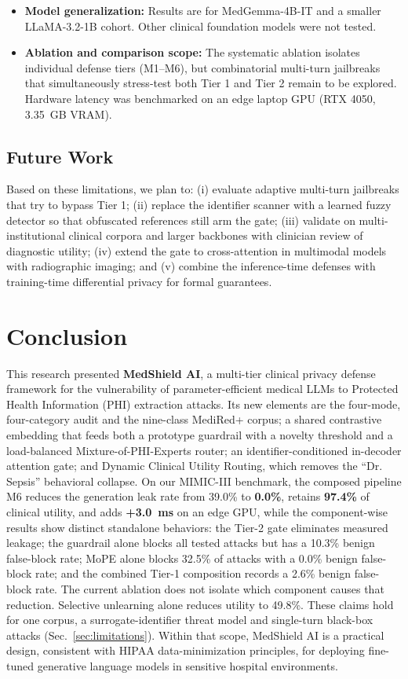 \documentclass[lettersize,journal]{IEEEtran}
\begin{document}
\begin{itemize}
    \item \textbf{Model generalization:} Results are for MedGemma-4B-IT and a smaller LLaMA-3.2-1B cohort. Other clinical foundation models were not tested.
    \item \textbf{Ablation and comparison scope:} The systematic ablation isolates individual defense tiers (M1--M6), but combinatorial multi-turn jailbreaks that simultaneously stress-test both Tier 1 and Tier 2 remain to be explored. Hardware latency was benchmarked on an edge laptop GPU (RTX 4050, 3.35~GB VRAM).
\end{itemize}

\subsection{Future Work}
Based on these limitations, we plan to: (i) evaluate adaptive multi-turn jailbreaks that try to bypass Tier 1; (ii) replace the identifier scanner with a learned fuzzy detector so that obfuscated references still arm the gate; (iii) validate on multi-institutional clinical corpora and larger backbones with clinician review of diagnostic utility; (iv) extend the gate to cross-attention in multimodal models with radiographic imaging; and (v) combine the inference-time defenses with training-time differential privacy for formal guarantees.

\section{Conclusion}
This research presented \textbf{MedShield AI}, a multi-tier clinical privacy defense framework for the vulnerability of parameter-efficient medical LLMs to Protected Health Information (PHI) extraction attacks. Its new elements are the four-mode, four-category audit and the nine-class MediRed+ corpus; a shared contrastive embedding that feeds both a prototype guardrail with a novelty threshold and a load-balanced Mixture-of-PHI-Experts router; an identifier-conditioned in-decoder attention gate; and Dynamic Clinical Utility Routing, which removes the ``Dr. Sepsis'' behavioral collapse. On our MIMIC-III benchmark, the composed pipeline M6 reduces the generation leak rate from 39.0\% to \textbf{0.0\%}, retains \textbf{97.4\%} of clinical utility, and adds \textbf{+3.0~ms} on an edge GPU, while the component-wise results show distinct standalone behaviors: the Tier-2 gate eliminates measured leakage; the guardrail alone blocks all tested attacks but has a 10.3\% benign false-block rate; MoPE alone blocks 32.5\% of attacks with a 0.0\% benign false-block rate; and the combined Tier-1 composition records a 2.6\% benign false-block rate. The current ablation does not isolate which component causes that reduction. Selective unlearning alone reduces utility to 49.8\%. These claims hold for one corpus, a surrogate-identifier threat model and single-turn black-box attacks (Sec.~\ref{sec:limitations}). Within that scope, MedShield AI is a practical design, consistent with HIPAA data-minimization principles, for deploying fine-tuned generative language models in sensitive hospital environments.
\end{document}

